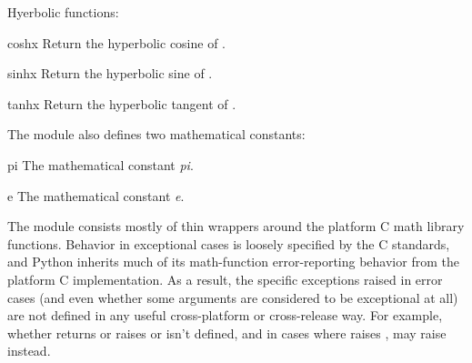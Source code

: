 Hyerbolic functions:

\begin{funcdesc}{cosh}{x}
Return the hyperbolic cosine of .
\end{funcdesc}

\begin{funcdesc}{sinh}{x}
Return the hyperbolic sine of .
\end{funcdesc}

\begin{funcdesc}{tanh}{x}
Return the hyperbolic tangent of .
\end{funcdesc}

The module also defines two mathematical constants:

\begin{datadesc}{pi}
The mathematical constant \emph{pi}.
\end{datadesc}

\begin{datadesc}{e}
The mathematical constant \emph{e}.
\end{datadesc}

\begin{notice}
  The  module consists mostly of thin wrappers around
  the platform C math library functions.  Behavior in exceptional cases is
  loosely specified by the C standards, and Python inherits much of its
  math-function error-reporting behavior from the platform C
  implementation.  As a result,
  the specific exceptions raised in error cases (and even whether some
  arguments are considered to be exceptional at all) are not defined in any
  useful cross-platform or cross-release way.  For example, whether
   returns  or raises  or
   isn't defined, and in
  cases where  raises ,
   may raise  instead.
\end{notice}

\begin{seealso}
\end{seealso}
